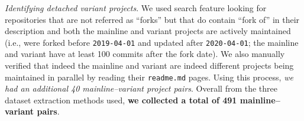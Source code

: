 \nd \textit{Identifying detached variant projects}. We used \gh search feature looking for repositories that are not referred as ``forks'' but that do contain ``fork of'' in their description and both the mainline and variant projects are actively maintained (i.e., were forked before \texttt{2019-04-01} and updated after \texttt{2020-04-01}; the mainline and variant have at least 100 commits after the fork date). We also manually verified that indeed the mainline and variant are indeed different projects being maintained in parallel by reading their \texttt{readme.md} pages. Using this process, \textit{we had an additional 40 mainline–variant project pairs}.
Overall from the three dataset extraction methods used, \textbf{we collected a total of 491 mainline--variant pairs}.



